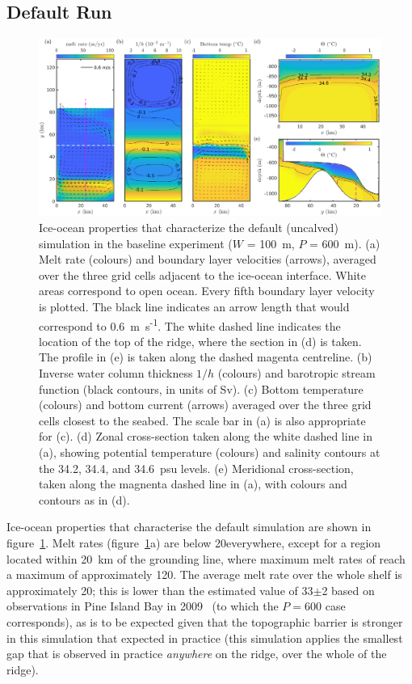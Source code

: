 \documentclass[draft]{agujournal2019}
\begin{document}
\subsection{Default Run}\label{S:Baseline:Default}
\begin{figure}
    \centering
    \includegraphics[width = \textwidth]{../make_figures/plots/figure3.eps}
    \caption{Ice-ocean properties that characterize the default (uncalved) simulation in the baseline experiment ($W$ = 100~m, $P$ = 600~m). (a) Melt rate (colours) and boundary layer velocities (arrows), averaged over the three grid cells adjacent to the ice-ocean interface. White areas correspond to open ocean. Every fifth boundary layer velocity is plotted. The black line indicates an arrow length that would correspond to 0.6~m~s\textsuperscript{-1}. The white dashed line indicates the location of the top of the ridge, where the section in (d) is taken. The profile in (e) is taken along the dashed magenta centreline. (b) Inverse water column thickness $1/h$ (colours) and barotropic stream function (black contours, in units of Sv). (c) Bottom temperature (colours) and bottom current (arrows) averaged over the three grid cells closest to the seabed. The scale bar in (a) is also appropriate for (c). (d) Zonal cross-section taken along the white dashed line in (a), showing potential temperature (colours) and salinity contours at the 34.2, 34.4, and 34.6~psu levels. (e) Meridional cross-section, taken along the magnenta dashed line in (a), with colours and contours as in (d).}
    \label{fig:figure3}
\end{figure}

Ice-ocean properties that characterise the default simulation are shown in figure~\ref{fig:figure3}. Melt rates (figure~\ref{fig:figure3}a) are below  20\mpryr everywhere, except for a region located within 20~km of the grounding line, where maximum melt rates of reach a maximum of approximately 120\mpryr. The average melt rate over the whole shelf is approximately 20\mpryr; this is lower than the estimated value of 33$\pm$2 based on observations in Pine Island Bay in 2009~\cite{Jenkins2010NatureGeo} (to which the $P=600$ case corresponds), as is to be expected given that the topographic barrier is stronger in this simulation that expected in practice (this simulation applies the smallest gap that is observed in practice \textit{anywhere} on the ridge, over the whole of the ridge).
\end{document}
